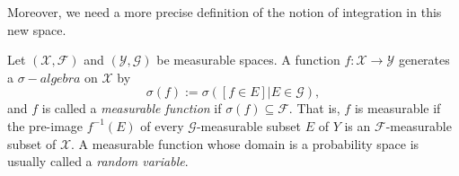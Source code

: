 Moreover, we need a more precise definition of the notion of integration in this new space.
\begin{defn}
	Let $(\mathscr{X}, \mathscr{F})$ and $(\mathscr{Y}, \mathscr{G})$ be measurable spaces. A function $f : \mathscr{X} \to \mathscr{Y}$
generates a $\sigma-algebra$ on $\mathscr{X}$ by
	\begin{equation*}
	\sigma(f) := \sigma({[f \in E] | E \in \mathscr{G}}) ,
	\end{equation*}
	and $f$ is called a \textit{measurable function} if $\sigma(f) \subseteq \mathscr{F}$. That is, $f$ is measurable if the pre-image
$f^{-1}(E)$ of every $\mathscr{G}$-measurable subset $E$ of $Y$ is an $\mathscr{F}$-measurable subset of $\mathscr{X}$. A measurable
function whose domain is a probability space is usually called a \textit{random variable}.
\end{defn}
